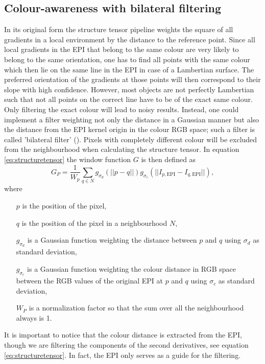 \documentclass  [
  paper    = a4,
  BCOR     = 10mm,
  twoside,
  fontsize = 12pt,
  fleqn,
  toc      = bibnumbered,
  toc      = listofnumbered,
  numbers  = noendperiod,
  headings = normal,
  listof   = leveldown,
  version  = 3.03
]                                       {scrreprt}
\begin{document}
 \subsection{Colour-awareness with bilateral filtering}
 \label{sec:bilateral}
 In its original form the structure tensor pipeline weights the square of all gradients in a local environment by the distance to the reference point. Since all local gradients in the EPI that belong to the same colour are very likely to belong to the same orientation, one has to find all points with the same colour which then lie on the same line in the EPI in case of a Lambertian surface. The preferred orientation of the gradients at those points will then correspond to their slope with high confidence. However, most objects are not perfectly Lambertian such that not all points on the correct line have to be of the exact same colour. Only filtering the exact colour will lead to noisy results. Instead, one could implement a filter weighting not only the distance in a Gaussian manner but also the distance from the  EPI kernel origin in the colour RGB space; such a filter is called 'bilateral filter' (\cite{tomasi1998bilateral}). Pixels with completely different colour will be excluded from the neighbourhood when calculating the structure tensor. In equation \ref{eq:structuretensor} the window function $G$ is then defined as 
 \begin{equation}\label{eq:bilateral}
 G_P = \frac{1}{W_p}\sum_{q\in N} g_{\sigma_d}(||p-q||) g_{\sigma_c}(||I_{p, \text{EPI}}-I_{q, \text{EPI}}||),
 \end{equation}
 where
 \begin{itemize}
 	\item[$p$] is the position of the pixel,
 	\item[$q$] is the position of the pixel in a neighbourhood $N$,
 	\item[ $g_{\sigma_d}$] is a Gaussian function weighting the distance between $p$ and $q$ using $\sigma_d$ as standard deviation,
 	\item[ $g_{\sigma_c}$] is a Gaussian function weighting the colour distance in RGB space between the  RGB values of the original EPI at $p$ and $q$ using $\sigma_c$ as standard deviation,
 	\item[$W_P$] is a normalization factor so that the sum over all the neighbourhood always is 1. 
 \end{itemize}


It is important to notice that the colour distance is extracted from the EPI, though we are filtering the components of the second derivatives, see equation \ref{eq:structuretensor}. In fact, the EPI only serves as a guide for the filtering.
\end{document}
